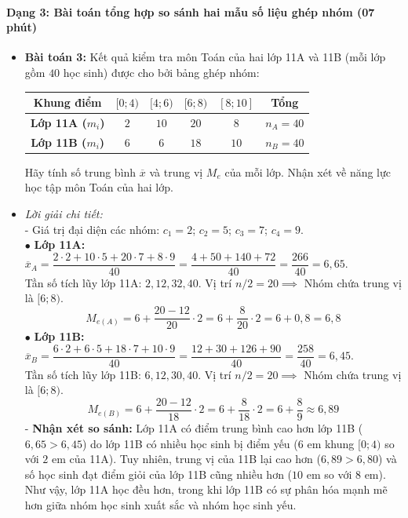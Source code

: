 \documentclass[12pt, a4paper]{article}
\begin{document}
\paragraph{Dạng 3: Bài toán tổng hợp so sánh hai mẫu số liệu ghép nhóm (07 phút)}
\begin{itemize}
    \item \textbf{Bài toán 3:} Kết quả kiểm tra môn Toán của hai lớp 11A và 11B (mỗi lớp gồm $40$ học sinh) được cho bởi bảng ghép nhóm:
    \begin{center}
    \begin{tabular}{|c|c|c|c|c|c|}
    \hline
    \textbf{Khung điểm} & $[0; 4)$ & $[4; 6)$ & $[6; 8)$ & $[8; 10]$ & \textbf{Tổng} \\
    \hline
    \textbf{Lớp 11A ($m_i$)} & $2$ & $10$ & $20$ & $8$ & $n_A = 40$ \\
    \hline
    \textbf{Lớp 11B ($m_i$)} & $6$ & $6$ & $18$ & $10$ & $n_B = 40$ \\
    \hline
    \end{tabular}
    \end{center}
    Hãy tính số trung bình $\overline{x}$ và trung vị $M_e$ của mỗi lớp. Nhận xét về năng lực học tập môn Toán của hai lớp.
    \item \textit{Lời giải chi tiết:}\\
    - Giá trị đại diện các nhóm: $c_1 = 2$; $c_2 = 5$; $c_3 = 7$; $c_4 = 9$.\\
    $\bullet$ \textbf{Lớp 11A:}\\
    $\overline{x}_A = \dfrac{2 \cdot 2 + 10 \cdot 5 + 20 \cdot 7 + 8 \cdot 9}{40} = \dfrac{4 + 50 + 140 + 72}{40} = \dfrac{266}{40} = 6{,}65$.\\
    Tần số tích lũy lớp 11A: $2, 12, 32, 40$. Vị trí $n/2 = 20 \implies$ Nhóm chứa trung vị là $[6; 8)$.\\
    $$M_{e(A)} = 6 + \dfrac{20 - 12}{20} \cdot 2 = 6 + \dfrac{8}{20} \cdot 2 = 6 + 0{,}8 = 6{,}8$$
    $\bullet$ \textbf{Lớp 11B:}\\
    $\overline{x}_B = \dfrac{6 \cdot 2 + 6 \cdot 5 + 18 \cdot 7 + 10 \cdot 9}{40} = \dfrac{12 + 30 + 126 + 90}{40} = \dfrac{258}{40} = 6{,}45$.\\
    Tần số tích lũy lớp 11B: $6, 12, 30, 40$. Vị trí $n/2 = 20 \implies$ Nhóm chứa trung vị là $[6; 8)$.\\
    $$M_{e(B)} = 6 + \dfrac{20 - 12}{18} \cdot 2 = 6 + \dfrac{8}{18} \cdot 2 = 6 + \dfrac{8}{9} \approx 6{,}89$$
    - \textbf{Nhận xét so sánh:}
    Lớp 11A có điểm trung bình cao hơn lớp 11B ($6{,}65 > 6{,}45$) do lớp 11B có nhiều học sinh bị điểm yếu ($6$ em khung $[0; 4)$ so với $2$ em của 11A). Tuy nhiên, trung vị của 11B lại cao hơn ($6{,}89 > 6{,}80$) và số học sinh đạt điểm giỏi của lớp 11B cũng nhiều hơn ($10$ em so với $8$ em). Như vậy, lớp 11A học đều hơn, trong khi lớp 11B có sự phân hóa mạnh mẽ hơn giữa nhóm học sinh xuất sắc và nhóm học sinh yếu.
\end{itemize}
\end{document}
